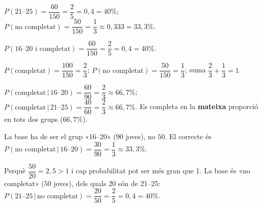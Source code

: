 \begin{solucions}
\begin{sollist}
  \item $P(\text{21--25})=\dfrac{60}{150}=\dfrac{2}{5}=0,4=40\%$;
        $P(\text{no completat})=\dfrac{50}{150}=\dfrac{1}{3}\approx 0,333=33,3\%$.
  \item $P(\text{16--20 i completat})=\dfrac{60}{150}=\dfrac{2}{5}=0,4=40\%$.
  \item $P(\text{completat})=\dfrac{100}{150}=\dfrac{2}{3}$;
        $P(\text{no completat})=\dfrac{50}{150}=\dfrac{1}{3}$; suma
        $\dfrac{2}{3}+\dfrac{1}{3}=1$. \checkmark
  \item $P(\text{completat}\,|\,\text{16--20})=\dfrac{60}{90}=\dfrac{2}{3}\approx 66,7\%$;
        $P(\text{completat}\,|\,\text{21--25})=\dfrac{40}{60}=\dfrac{2}{3}\approx 66,7\%$.
        Es completa en la \textbf{mateixa} proporció en tots dos grups ($66,7\%$).
  \item La base ha de ser el grup «16--20» ($90$ joves), no $50$. El correcte és
        $P(\text{no completat}\,|\,\text{16--20})=\dfrac{30}{90}=\dfrac{1}{3}\approx 33,3\%$.
  \item Perquè $\dfrac{50}{20}=2,5>1$ i cap probabilitat pot ser més gran que 1. La base
        és «no completat» ($50$ joves), dels quals $20$ són de 21--25:
        $P(\text{21--25}\,|\,\text{no completat})=\dfrac{20}{50}=\dfrac{2}{5}=0,4=40\%$.
\end{sollist}
\end{solucions}
